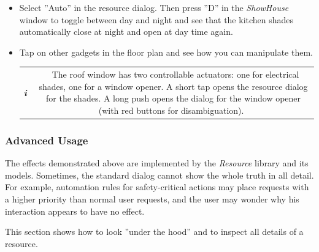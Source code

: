 \documentclass[12pt,english,parskip=half,headheight=19pt]{scrreprt}
\newcommand{\infobox}[1]{
  \par
  \medskip
  \hfill
  \setlength\arrayrulewidth{1pt}
  \begin{tabular}[t]{c|c|}
    \parbox{1.8em}{\hfill\textit{\Huge\textbf{i}\,}}
    &
    \,\parbox{0.89\linewidth}{\setlength{\parskip}{0.5em} \small #1}\,
  \end{tabular}
  \medskip
  \par
}
\begin{document}
\begin{itemize}[$\blacktriangleright$]
  \item
    Select ''Auto'' in the resource dialog. Then press ''D'' in the \textit{ShowHouse} window to
    toggle between day and night and see that the kitchen shades automatically close at night
    and open at day time again.

  \item
    Tap on other gadgets in the floor plan and see how you can manipulate them.
    \infobox{
      The roof window has two controllable actuators: one for electrical shades, one for a window opener.
      A short tap opens the resource dialog for the shades. A long push opens the dialog for the
      window opener (with red buttons for disambiguation).
    }

\end{itemize}


\subsubsection{Advanced Usage}

The effects demonstrated above are implemented by the \textit{Resource} library and its models.
Sometimes, the standard dialog cannot show the whole truth in all detail. For example, automation rules
for safety-critical actions may place requests with a higher priority than normal user requests, and
the user may wonder why his interaction appears to have no effect.

This section shows how to look ''under the hood'' and to inspect all details of a resource.
\end{document}
